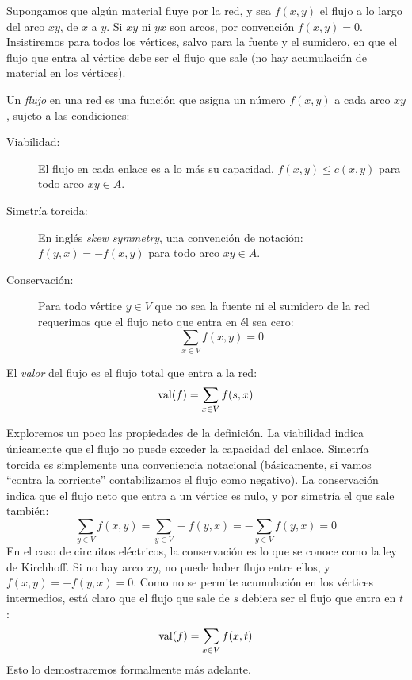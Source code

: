   Supongamos que algún material fluye por la red,
  y sea \(f(x, y)\) el flujo a lo largo del arco \(x y\),
  de \(x\) a \(y\).
  Si \(x y\) ni \(y x\) son arcos,
  por convención \(f(x, y) = 0\).
  Insistiremos para todos los vértices,
  salvo para la fuente y el sumidero,
  en que el flujo que entra al vértice debe ser el flujo que sale
  (no hay acumulación de material en los vértices).

  \begin{definition}
    Un \emph{flujo} en una red es una función
    que asigna un número \(f(x, y)\) a cada arco \(x y\),
    sujeto a las condiciones:
    \begin{description}
    \item[Viabilidad:]
      El flujo en cada enlace es a lo más su capacidad,
      \(f(x, y) \le c(x, y)\) para todo arco \(x y \in A\).
    \item[Simetría torcida:]
      En inglés \emph{\foreignlanguage{english}{skew symmetry}},
      una convención de notación:
      \(f(y, x) = -f(x, y)\) para todo arco \(x y \in A\).
    \item[Conservación:]
      Para todo vértice \(y \in V\)
      que no sea la fuente ni el sumidero de la red
      requerimos que el flujo neto que entra en él sea cero:
      \begin{equation*}
	\sum_{x \in V} f(x, y) = 0
      \end{equation*}
    \end{description}
    El \emph{valor} del flujo es el flujo total que entra a la red:
    \begin{equation*}
      \operatorname{val}(f) = \sum_{x \in V} f(s, x)
    \end{equation*}
  \end{definition}

  Exploremos un poco las propiedades de la definición.
  La viabilidad indica únicamente que el flujo
  no puede exceder la capacidad del enlace.
  Simetría torcida
  es simplemente una conveniencia notacional
  (básicamente,
   si vamos ``contra la corriente''
   contabilizamos el flujo como negativo).
  La conservación indica que el flujo neto
  que entra a un vértice es nulo,
  y por simetría el que sale también:
  \begin{equation*}
    \sum_{y \in V} f(x, y)
      = \sum_{y \in V} -f(y, x)
      = -\sum_{y \in V} f(y, x)
      = 0
  \end{equation*}
  En el caso de circuitos eléctricos,
  la conservación es lo que se conoce como la ley de Kirchhoff.%
  Si no hay arco \(x y\),
  no puede haber flujo entre ellos,
  y \(f(x, y) = - f(y, x) = 0\).
  Como no se permite acumulación en los vértices intermedios,
  está claro que el flujo que sale de \(s\)
  debiera ser el flujo que entra en \(t\):
  \begin{equation*}
    \operatorname{val}(f) = \sum_{x \in V} f(x, t)
  \end{equation*}
  Esto lo demostraremos formalmente más adelante.

